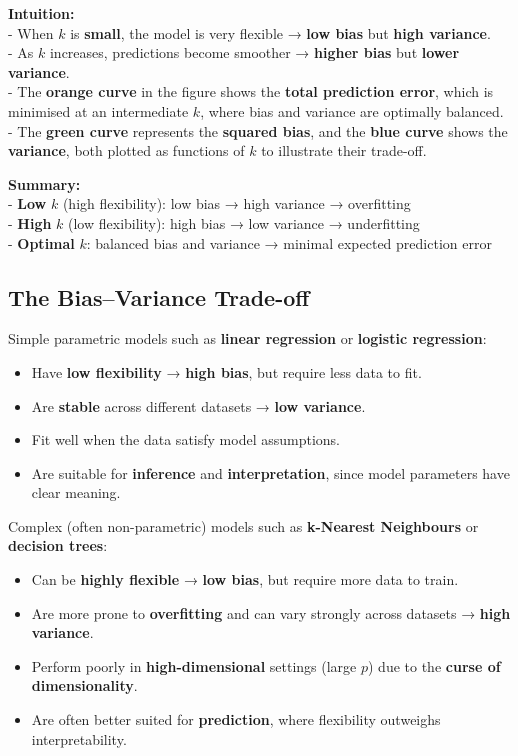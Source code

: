\documentclass[
  letterpaper,
  DIV=11,
  numbers=noendperiod]{scrartcl}
\providecommand{\tightlist}{%
  \setlength{\itemsep}{0pt}\setlength{\parskip}{0pt}}\usepackage{longtable,booktabs,array}
\begin{document}
\textbf{Intuition:}\\
- When \(k\) is \textbf{small}, the model is very flexible → \textbf{low
bias} but \textbf{high variance}.\\
- As \(k\) increases, predictions become smoother → \textbf{higher bias}
but \textbf{lower variance}.\\
- The \textbf{orange curve} in the figure shows the \textbf{total
prediction error}, which is minimised at an intermediate \(k\), where
bias and variance are optimally balanced.\\
- The \textbf{green curve} represents the \textbf{squared bias}, and the
\textbf{blue curve} shows the \textbf{variance}, both plotted as
functions of \(k\) to illustrate their trade-off.

\textbf{Summary:}\\
- \textbf{Low} \(k\) (high flexibility): low bias → high variance →
overfitting\\
- \textbf{High} \(k\) (low flexibility): high bias → low variance →
underfitting\\
- \textbf{Optimal} \(k\): balanced bias and variance → minimal expected
prediction error

\subsection{The Bias--Variance
Trade-off}\label{the-biasvariance-trade-off}

Simple parametric models such as \textbf{linear regression} or
\textbf{logistic regression}:

\begin{itemize}
\tightlist
\item
  Have \textbf{low flexibility} → \textbf{high bias}, but require less
  data to fit.
\item
  Are \textbf{stable} across different datasets → \textbf{low variance}.
\item
  Fit well when the data satisfy model assumptions.
\item
  Are suitable for \textbf{inference} and \textbf{interpretation}, since
  model parameters have clear meaning.
\end{itemize}

Complex (often non-parametric) models such as \textbf{k-Nearest
Neighbours} or \textbf{decision trees}:

\begin{itemize}
\tightlist
\item
  Can be \textbf{highly flexible} → \textbf{low bias}, but require more
  data to train.
\item
  Are more prone to \textbf{overfitting} and can vary strongly across
  datasets → \textbf{high variance}.
\item
  Perform poorly in \textbf{high-dimensional} settings (large \(p\)) due
  to the \textbf{curse of dimensionality}.
\item
  Are often better suited for \textbf{prediction}, where flexibility
  outweighs interpretability.
\end{itemize}
\end{document}

